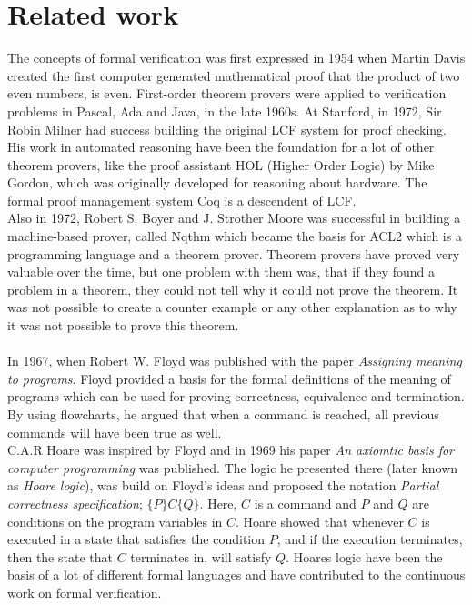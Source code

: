 \documentclass[a4paper]{report}
\begin{document}
\chapter{Related work}
The concepts of formal verification was first expressed in 1954 when Martin Davis created the first computer generated mathematical proof that the product of two even numbers, is even. First-order theorem provers were applied to verification problems in Pascal, Ada and Java, in the late 1960s. 
At Stanford, in 1972, Sir Robin Milner had success building the original LCF system for proof checking. His work in automated reasoning have been the foundation for a lot of other theorem provers, like the proof assistant HOL (Higher Order Logic) by Mike Gordon, which was originally developed for reasoning about hardware. The formal proof management system Coq is a descendent of LCF. \\
Also in 1972, Robert S. Boyer and J. Strother Moore was successful in building a machine-based prover, called Nqthm which became the basis for ACL2 which is a programming language and a theorem prover. Theorem provers have proved very valuable over the time, but one problem with them was, that if they found a problem in a theorem, they could not tell why it could not prove the theorem. It was not possible to create a counter example or any other explanation as to why it was not possible to prove this theorem. \\\\
In 1967, when Robert W. Floyd was published with the paper \textit{Assigning meaning to programs}\cite{Floyd1967}. Floyd provided a basis for the formal definitions of the meaning of programs which can be used for proving correctness, equivalence and termination. By using flowcharts, he argued that when a command is reached, all previous commands will have been true as well.\\ C.A.R Hoare was inspired by Floyd and in 1969 his paper \textit{An axiomtic basis for computer programming}\cite{Hoare1969} was published. The logic he presented there (later known as \textit{Hoare logic}), was build on Floyd's ideas and proposed the notation \textit{Partial correctness specification}; $\{P\} C \{Q\}$. Here, $C$ is a command and $P$ and $Q$ are conditions on the program variables in $C$. Hoare showed that whenever $C$ is executed in a state that satisfies the condition $P$, and if the execution terminates, then the state that $C$ terminates in, will satisfy $Q$. Hoares logic have been the basis of a lot of different formal languages and have contributed to the continuous work on formal verification. \\
\end{document}
